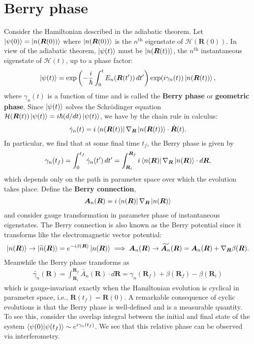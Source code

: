 \documentclass{article}
\theoremstyle{definition}
\newcommand{\f}[2]{\frac{#1}{#2}}
\newcommand{\lp}{\left(}
\newcommand{\rp}{\right)}
\begin{document}
\section{Berry phase}
Consider the Hamiltonian described in the adiabatic theorem.  Let $\ket{\psi(0)} = \ket{n(\bm{R}(0))}$ where $\ket{n(\bm{R}(0))}$ is the $n^\text{th}$ eigenstate of $\mathcal{H}(\bm{R}(0))$. In view of the adiabatic theorem, $\ket{\psi(t)}$ must be $\ket{n(\bm{R}(t))}$, the $n^\text{th}$ instantaneous eigenstate of $\mathcal{H}(t)$, up to a phase factor:
\begin{align*}
\ket{\psi(t)} = \exp\lp -\f{i}{\hbar }\int_0^t E_n(\bm{R} (t'))\,dt'   \rp \exp(i\gamma_n(t)) \ket{n(\bm{R}(t))},
\end{align*}
where $\gamma_n(t)$ is a function of time and is called the \textbf{Berry phase} or \textbf{geometric phase}. Since $\ket{\psi(t)}$ solves the Schr\"{o}dinger equation $\mathcal{H}(\bm{R}(t)) \ket{\psi(t)} = i\hbar (d/dt) \ket{{\psi}(t)}$, we have by the chain rule in calculus:
\begin{align*}
\dot{\gamma}_n(t) = i \bra{n(\bm{R}(t))} \nabla_{\bm{R}}  \ket{n(\bm{R}(t)) } \cdot \dot{\bm{R}}(t).
\end{align*}
In particular, we find that at some final time $t_f$, the Berry phase is given by 
\begin{align*}
\gamma_n(t_f) = \int_{0}^{t_f} \dot{\gamma}_n(t')\,dt' =   \int^{\bm{R}_f}_{\bm{R}_i} i \bra{n(\bm{R})} \nabla_{\bm{R}}  \ket{n(\bm{R}) } \cdot d{\bm{R}},
\end{align*} 
which depends only on the path in parameter space over which the evolution takes place. Define the \textbf{Berry connection}, 
\begin{align*}
\bm{A}_n(\bm{R}) = i \bra{n(\bm{R})} \nabla_{\bm{R}}  \ket{n(\bm{R}) }
\end{align*} 
and consider gauge transformation in parameter phase of instantaneous eigenstates. The Berry connection is also known as the Berry potential since it transforms like the electromagnetic  vector potential:
\begin{align*}
\ket{n(\bm{R})} \to \ket{\widetilde{n}(\bm{R})} = e^{-i\beta(\bm{R})}\ket{n(\bm{R})}  \implies \bm{A}_n(\bm{R}) \to  \widetilde{\bm{A}_n}(\bm{R}) = \bm{A}_n(\bm{R}) + \nabla_{\bm{R}} \beta (\bm{R}). 
\end{align*}
Meanwhile the Berry phase transforms as
\begin{align*}
\widetilde{\gamma_n} (\bm{R}) = \int_{\bm{R}_i}^{\bm{R}_f} \widetilde{A_n}(\bm{R})\cdot d\bm{R} = \gamma_n(\bm{R}_f)  + \beta(\bm{R}_f) - \beta({\bm{R}_i})
\end{align*}
which is gauge-invariant exactly when the Hamiltonian evolution is cyclical in parameter space, i.e., $\bm{R}(t_f) = \bm{R}(0)$. A remarkable consequence of cyclic evolutions is that the Berry phase is well-defined and is a measurable quantity. To see this, consider the overlap integral between the initial and final state of the system $\bra{\psi(0)}\ket{\psi(t_f)} \sim e^{i\gamma_n(t_f)}$. We see that this relative phase can be observed via interferometry. \\
\end{document}
